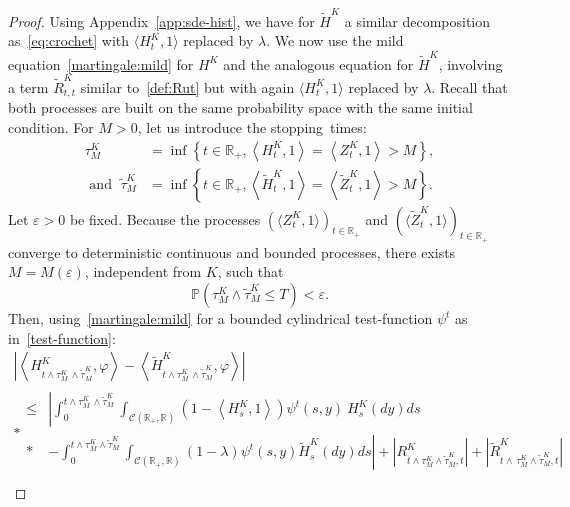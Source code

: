 \documentclass[AHL,Unicode,longabstracts,published]{cedram}
\newcommand{\Co}{\mathcal{C}}
\renewcommand*\P{\mathbb{P}}
\newcommand*\R{\mathbb{R}}
\begin{document}
\begin{proof}
Using Appendix~\ref{app:sde-hist}, we have for $\widetilde{H}^K$ a similar decomposition as~\eqref{eq:crochet} with $\langle H^{K}_{t},1\rangle$ replaced by $\lambda$. We now use the mild equation~\eqref{martingale:mild} for $H^K$ and the analogous equation for $\widetilde{H}^K$, involving a term $\widetilde{R}^K_{t, t}$ similar to~\eqref{def:Rut} but with again $\langle H^{K}_{t},1\rangle$ replaced by $\lambda$. Recall that both processes are built on the same probability space with the same initial condition. For $M>0$, let us introduce the stopping~times:
\begin{equation}
\begin{split}
 \tau^K_M &=\inf\left\{t\in \R_+,\left\langle H^K_t,1\right\rangle =\left\langle Z^K_t,1\right\rangle > M \right\},\\
\text{ and }\;
\widetilde{\tau}^K_M  &=\inf\left\{t\in \R_+,\left\langle \widetilde{H}^K_t,1\right\rangle =\left\langle \widetilde{Z}^K_t,1\right\rangle > M\right\}.
\end{split}
\end{equation}
Let $\varepsilon>0$ be fixed. Because the processes $(\langle Z^K_t,1\rangle)_{t \in \R_+}$ and $(\langle \widetilde{Z}^K_t,1\rangle)_{t \in \R_+}$ converge to deterministic continuous and bounded processes, there exists $M=M(\varepsilon)$, independent from $K$, such that
\[
\P\left(\tau^K_M \wedge \widetilde{\tau}^K_M\leq T\right)<\varepsilon.
\]
Then, using~\eqref{martingale:mild} for a bounded cylindrical test-function $\psi^t$ as in~\eqref{test-function}:
\begingroup
\allowdisplaybreaks
\begin{multline*}
\left|\left\langle H^{K}_{t \wedge \tau^K_M\,\wedge \widetilde{\tau}^K_M},\varphi\right\rangle-\left\langle\widetilde{H}^{K}_{t \wedge \tau^K_M\,\wedge  \widetilde{\tau}^K_M},\varphi \right\rangle \right| \\*
\begin{aligned}
\leq & \left|\int_0^{t \wedge \tau^K_M\,\wedge  \widetilde{\tau}^K_M} \int_{\Co\left(\R_+, \R\right)} \left(1- \left\langle H^K_s,1\right\rangle\right)\psi^t(s,y)\ H^K_s(dy)  ds \right.\\*
& \left. - \int_0^{t \wedge \tau^K_M \wedge \widetilde{\tau}^K_M} \int_{\Co\left(\R_+, \R\right)} \left(1- \lambda\right)\psi^t(s,y)\widetilde{H}^K_s(dy) ds \right| + \left| R_{t \wedge \tau^K_M \wedge  \widetilde{\tau}^K_M, t}^{K} \right| + \left|\widetilde{R}_{t \wedge\,\tau^K_M \wedge  \widetilde{\tau}^K_M, t}^K\right|\\

\end{aligned}
\end{multline*}
\end{proof}
\end{document}

